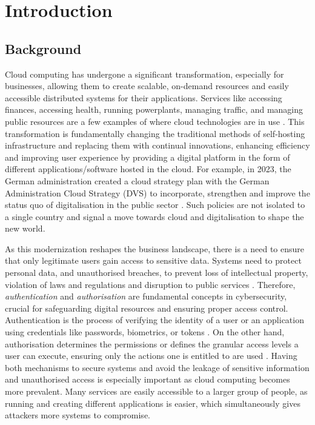 \chapter{Introduction}
\section{Background}
Cloud computing has undergone a significant transformation, especially for businesses, allowing them to create scalable, on-demand resources and easily accessible distributed systems for their applications.
Services like accessing finances, accessing health, running powerplants, managing traffic, and managing public resources are a few examples of where cloud technologies are in use \citep{intro_cloud_critical_infra}.
This transformation is fundamentally changing the traditional methods of self-hosting infrastructure and replacing them with continual innovations, enhancing efficiency and improving user experience by providing a digital platform in the form of different applications/software hosted in the cloud.
For example, in 2023, the German administration created a cloud strategy plan with the German Administration Cloud Strategy (DVS) to incorporate, strengthen and improve the status quo of digitalisation in the public sector \citep{german_gov_cloud_plan}.
Such policies are not isolated to a single country and signal a move towards cloud and digitalisation to shape the new world. \newline

As this modernization reshapes the business landscape, there is a need to ensure that only legitimate users gain access to sensitive data.
Systems need to protect personal data, and unauthorised breaches, to prevent loss of intellectual property, violation of laws and regulations and disruption to public services \citep{critical_infra_reason}.
Therefore, \textit{authentication} and \textit{authorisation} are fundamental concepts in cybersecurity, crucial for safeguarding digital resources and ensuring proper access control.
\newline
Authentication is the process of verifying the identity of a user or an application using credentials like passwords, biometrics, or tokens \citep{authetication_intro}.
On the other hand, authorisation determines the permissions or defines the granular access levels a user can execute, ensuring only the actions one is entitled to are used \citep{Gollmann2021-at}.
Having both mechanisms to secure systems and avoid the leakage of sensitive information and unauthorised access is especially important as cloud computing becomes more prevalent.
Many services are easily accessible to a larger group of people, as running and creating different applications is easier, which simultaneously gives attackers more systems to compromise.\newline

